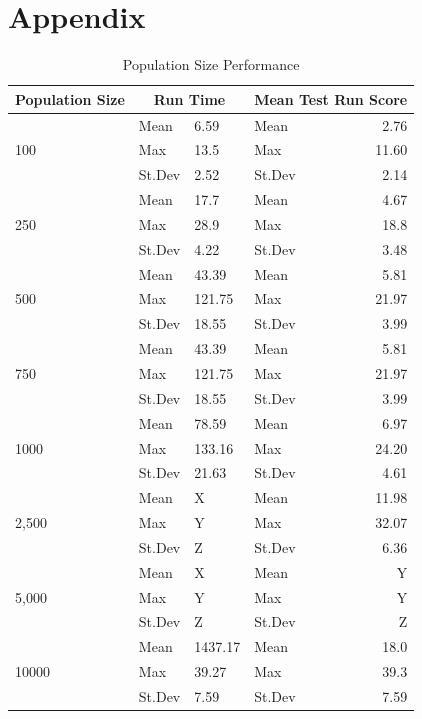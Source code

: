 \documentclass{article}
\begin{document}
\newpage
\raggedright
{}


\newpage
\section{Appendix}

\begin{table}[h]
\begin{center}
\begin{tabular}{|l|l|l|l|r|}
\hline%
\textbf{Population Size} & \multicolumn{2}{c|}{\textbf{Run Time}} & \multicolumn{2}{c|}{\textbf{Mean Test Run Score}} \\
\hline
\multirow{3}{*}{100}
& Mean & 6.59 & Mean & 2.76 \\
& Max & 13.5 & Max & 11.60 \\
& St.Dev & 2.52 & St.Dev & 2.14 \\
\hline
\multirow{3}{*}{250}
& Mean & 17.7 & Mean & 4.67 \\
& Max & 28.9 & Max & 18.8 \\
& St.Dev & 4.22 & St.Dev & 3.48 \\
\hline
\multirow{3}{*}{500}
& Mean & 43.39 & Mean & 5.81 \\
& Max & 121.75 & Max & 21.97 \\
& St.Dev & 18.55 & St.Dev & 3.99 \\
\hline
\multirow{3}{*}{750}
& Mean & 43.39 & Mean & 5.81 \\
& Max & 121.75 & Max & 21.97 \\
& St.Dev & 18.55 & St.Dev & 3.99 \\
\hline
\multirow{3}{*}{1000}
& Mean & 78.59 & Mean & 6.97 \\
& Max & 133.16 & Max & 24.20 \\
& St.Dev & 21.63 & St.Dev & 4.61 \\
\hline
\multirow{3}{*}{2,500}
& Mean & X & Mean & 11.98 \\
& Max & Y & Max & 32.07 \\
& St.Dev & Z & St.Dev & 6.36 \\
\hline
\multirow{3}{*}{5,000}
& Mean & X & Mean & Y \\
& Max & Y & Max & Y \\
& St.Dev & Z & St.Dev & Z \\
\hline
\multirow{3}{*}{10000}
& Mean & 1437.17 & Mean & 18.0 \\
& Max & 39.27 & Max & 39.3 \\
& St.Dev & 7.59 & St.Dev & 7.59 \\
\hline
\end{tabular}
\end{center}
\caption{Population Size Performance}
\label{table:population_size}
\end{table}
\end{document}
